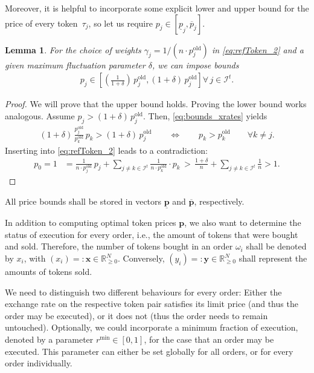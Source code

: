 \documentclass[11pt,parskip=full]{scrartcl}%
\newcommand*{\ie}{i.e., }
\newcommand*{\Min}{\mathrm{min}}
\newcommand*{\itokens}{\mathcal{I}^t}       %
\newtheorem{lemma}[theorem]{Lemma}
\begin{document}
Moreover, it is helpful to incorporate some explicit lower and upper bound for the price of every
token~$ \tau_j $, so let us require $ p_j \in [\underline{p}_j,\overline{p}_j] $.

\begin{lemma}
  For the choice of weights $ \gamma_j = 1 / (n \cdot p_j^\mathrm{old}) $ in \eqref{eq:refToken_2}
  and a given maximum fluctuation parameter $ \delta $, we can impose bounds
  \begin{align}
    p_j \in \left[ \left(\frac{1}{1+\delta}\right) \, p^\mathrm{old}_j, (1+\delta) \,
  p^
  \mathrm{old}_j \right] \forall \, j \in \itokens.
  \end{align}
\end{lemma}
\vspace{-.5cm}
\begin{proof}
  We will prove that the upper bound holds.
  Proving the lower bound works analogous.
  Assume $ p_j > (1+\delta) \, p_j^\mathrm{old} $.
  Then, \eqref{eq:bounds_xrates} yields
  \begin{align*}
    (1+\delta) \, \frac{p^\mathrm{old}_j}{p^\mathrm{old}_k} \, p_k > (1+\delta) \, p_j^\mathrm{old}
    \qquad \Leftrightarrow \qquad p_k > p_k^\mathrm{old}
    \qquad \forall k \neq j.
  \end{align*}
  Inserting into \eqref{eq:refToken_2} leads to a contradiction:
  \begin{align*}
    p_0 = 1
    &= \frac{1}{n \cdot p_j^\mathrm{old}} \, p_j + \sum\limits_{j \neq k \in \itokens}
      \frac{1}{n \cdot p_k^\mathrm{old}} \cdot p_k
    \, > \, \frac{1+\delta}{n} + \sum\limits_{j \neq k \in \itokens} \frac{1}{n} > 1.
  \end{align*}
\end{proof}
\vspace{-.4cm}

All price bounds shall be stored in vectors $ \underline{\mathbf{p}} $ and $ \overline{\mathbf{p}}
$, respectively.

In addition to computing optimal token prices $ \mathbf{p} $, we also want to determine the status
of execution for every order, \ie the amount of tokens that were bought and sold.
Therefore, the number of tokens bought in an order $ \omega_i $ shall be denoted by $ x_i $, with
$ (x_i) =: \mathbf{x} \in \mathbb{R}^N_{\ge 0} $.
Conversely, $ (y_i) =: \mathbf{y} \in \mathbb{R}^N_{\ge 0} $ shall represent the amounts of tokens
sold.

We need to distinguish two different behaviours for every order: Either the exchange rate
on the respective token pair satisfies its limit price (and thus the order may be executed), or it
does not (thus the order needs to remain untouched).
Optionally, we could incorporate a minimum fraction of execution, denoted by a parameter
$ r^\Min \in [0,1] $, for the case that an order may be executed.
This parameter can either be set globally for all orders, or for every order individually.
\end{document}
